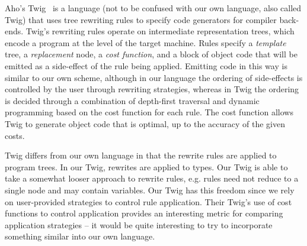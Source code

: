 Aho's Twig~\cite{aho-twig} is a language (not to be confused with
our own language, also called Twig) that uses tree rewriting rules
to specify code generators for compiler back-ends. Twig's
rewriting rules operate on intermediate representation trees,
which encode a program at the level of the target machine. Rules
specify a \emph{template} tree, a \emph{replacement} node, a
\emph{cost function}, and a block of object code that will be
emitted as a side-effect of the rule being applied. Emitting code
in this way is similar to our own scheme, although in our language
the ordering of side-effects is controlled by the user through
rewriting strategies, whereas in Twig the ordering is decided
through a combination of depth-first traversal and dynamic
programming based on the cost function for each rule. The cost
function allows Twig to generate object code that is optimal, up
to the accuracy of the given costs.

Twig differs from our own language in that the rewrite rules are
applied to program trees. In our Twig, rewrites are applied to
types. Our Twig is able to take a somewhat looser approach to
rewrite rules, e.g. rules need not reduce to a single node and may
contain variables. Our Twig has this freedom since we rely on
user-provided strategies to control rule application. Their Twig's
use of cost functions to control application provides an
interesting metric for comparing application strategies -- it
would be quite interesting to try to incorporate something similar
into our own language.
